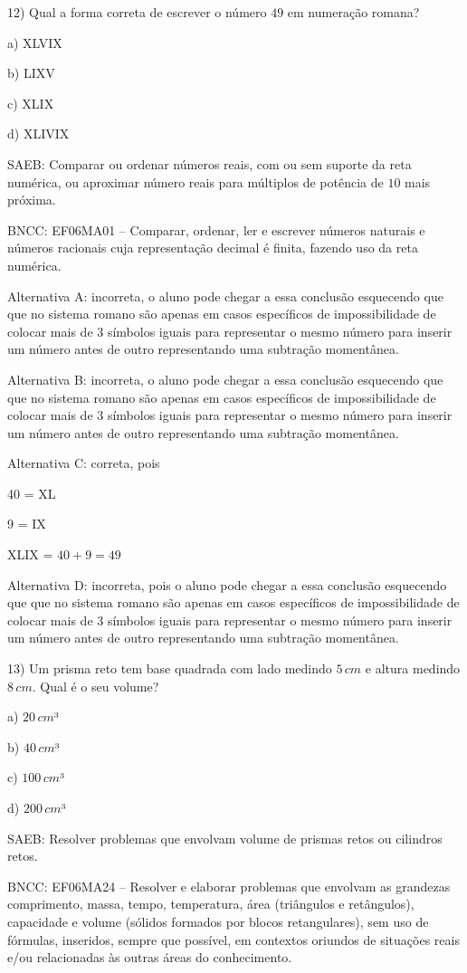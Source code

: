 12) Qual a forma correta de escrever o número $49$ em numeração romana?

a) XLVIX

b) LIXV

c) XLIX

d) XLIVIX

SAEB: Comparar ou ordenar números reais, com ou sem suporte da reta
numérica, ou aproximar número reais para múltiplos de potência de $10$
mais próxima.

BNCC: EF06MA01 -- Comparar, ordenar, ler e escrever números naturais e
números racionais cuja representação decimal é finita, fazendo uso da
reta numérica.

Alternativa A: incorreta, o aluno pode chegar a essa conclusão
esquecendo que que no sistema romano são apenas em casos específicos de
impossibilidade de colocar mais de $3$ símbolos iguais para representar o
mesmo número para inserir um número antes de outro representando uma
subtração momentânea.

Alternativa B: incorreta, o aluno pode chegar a essa conclusão
esquecendo que que no sistema romano são apenas em casos específicos de
impossibilidade de colocar mais de $3$ símbolos iguais para representar o
mesmo número para inserir um número antes de outro representando uma
subtração momentânea.

Alternativa C: correta, pois

40 = XL

9 = IX

XLIX = $40 + 9 = 49$

Alternativa D: incorreta, pois o aluno pode chegar a essa conclusão
esquecendo que que no sistema romano são apenas em casos específicos de
impossibilidade de colocar mais de $3$ símbolos iguais para representar o
mesmo número para inserir um número antes de outro representando uma
subtração momentânea.

13) Um prisma reto tem base quadrada com lado medindo $5\,cm$ e altura
medindo $8\,cm$. Qual é o seu volume?

a) $20\,cm$³

b) $40\,cm$³

c) $100\,cm$³

d) $200\,cm$³

SAEB: Resolver problemas que envolvam volume de prismas retos ou
cilindros retos.

BNCC: EF06MA24 -- Resolver e elaborar problemas que envolvam as
grandezas comprimento, massa, tempo, temperatura, área (triângulos e
retângulos), capacidade e volume (sólidos formados por blocos
retangulares), sem uso de fórmulas, inseridos, sempre que possível, em
contextos oriundos de situações reais e/ou relacionadas às outras áreas
do conhecimento.

